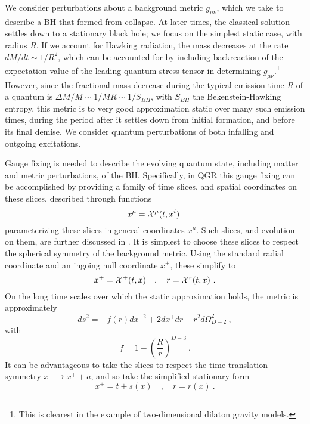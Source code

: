 \documentclass[11pt]{article}
\numberwithin{equation}{section}
\newcommand{\calx}{{\cal X}}
\newcommand{\beq}{\begin{equation}}
\newcommand{\eeq}{\end{equation}}
\begin{document}
We consider perturbations about a background metric $g_{\mu\nu}$, which we take to describe a BH that formed from collapse.  At later times, the classical solution settles down to a stationary black hole; we focus on the simplest  static case, with radius $R$. If we account for Hawking radiation, the mass decreases at the rate $dM/dt \sim 1/R^2$, which can be accounted for by including backreaction of the expectation value of the leading quantum stress tensor in determining $g_{\mu\nu}$.\footnote{This is clearest in the example of two-dimensional dilaton gravity models\cite{CGHS,SGTrieste}.}  
However, since the fractional mass decrease during the typical emission time $R$ of a quantum is $\Delta M/M\sim 1/MR\sim 1/S_{BH}$, with $S_{BH}$ the Bekenstein-Hawking entropy, this metric is to very good approximation static over many such emission times, during the period after it settles down from initial formation, and before its final demise.  
We consider quantum perturbations of both infalling and outgoing excitations.
%

Gauge fixing is needed to describe the evolving quantum state, including  matter and metric perturbations, of the BH.  Specifically, in QGR this gauge fixing can be accomplished by providing a family of time slices, and spatial coordinates on these slices, described through functions
\beq\label{slices}
x^\mu =\calx^\mu(t, x^i)\ 
\eeq
parameterizing these slices in general coordinates $x^\mu$.  Such slices, and evolution on them, are further discussed in \cite{SEHS,SE2d}\cite{GiPe1}.
It is simplest to choose these slices to respect the spherical symmetry of the background metric.  Using the standard radial coordinate and an ingoing null coordinate $x^+$, these simplify to
\beq\label{radslices}
x^+=\calx^+(t,x)\quad ,\quad r=\calx^r(t,x)\ .
\eeq
On the long time scales over which the static approximation holds, the metric is approximately
\beq\label{Schw}
ds^2=-f(r) dx^{+2} + 2 dx^+ dr + r^2 d\Omega_{D-2}^2\ ,
\eeq
with
\beq
f= 1-\left(\frac{R}{r}\right)^{D-3}\ .
\eeq
It can be advantageous to take the slices to respect the time-translation symmetry $x^+\rightarrow x^+ + a$, and so take the simplified stationary 
form\cite{NVU}\cite{SEHS}\cite{GiPe1}
\beq\label{statslices}
x^+= t+s(x)\quad,\quad r=r(x)\ .
\eeq
\end{document}
